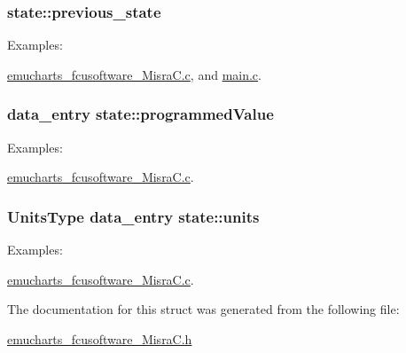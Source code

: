 \subsubsection[{\texorpdfstring{previous\+\_\+state}{previous_state}}]{ state\+::previous\+\_\+state}\hypertarget{structstate_a5c3872ddbefc0dd4f0a5e8a6f8dfe9d1}{}\label{structstate_a5c3872ddbefc0dd4f0a5e8a6f8dfe9d1}
\begin{Desc}
\item[Examples\+: ]\par
\hyperlink{emucharts_fcusoftware__misra_c_8c-example}{emucharts\+\_\+fcusoftware\+\_\+\+Misra\+C.\+c}, and \hyperlink{main_8c-example}{main.\+c}.\end{Desc}
\subsubsection[{\texorpdfstring{programmed\+Value}{programmedValue}}]{ data\+\_\+entry state\+::programmed\+Value}\hypertarget{structstate_af8641ad0a4a4d007541ee08a327c76ce}{}\label{structstate_af8641ad0a4a4d007541ee08a327c76ce}
\begin{Desc}
\item[Examples\+: ]\par
\hyperlink{emucharts_fcusoftware__misra_c_8c-example}{emucharts\+\_\+fcusoftware\+\_\+\+Misra\+C.\+c}.\end{Desc}
\subsubsection[{\texorpdfstring{units}{units}}]{\setlength{\rightskip}{0pt plus 5cm}Units\+Type data\+\_\+entry state\+::units}\hypertarget{structstate_a432520cd6c29e82918b25bc99b0f1e9f}{}\label{structstate_a432520cd6c29e82918b25bc99b0f1e9f}
\begin{Desc}
\item[Examples\+: ]\par
\hyperlink{emucharts_fcusoftware__misra_c_8c-example}{emucharts\+\_\+fcusoftware\+\_\+\+Misra\+C.\+c}.\end{Desc}


The documentation for this struct was generated from the following file\+:\begin{DoxyCompactItemize}
\item 
\hyperlink{emucharts__fcusoftware___misra_c_8h}{emucharts\+\_\+fcusoftware\+\_\+\+Misra\+C.\+h}\end{DoxyCompactItemize}
